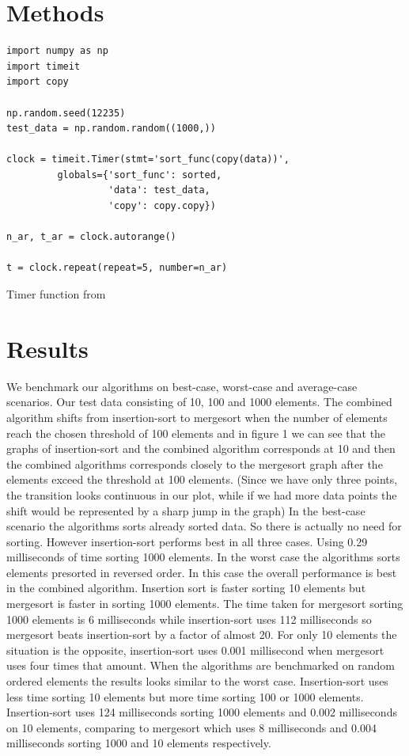 \documentclass[sigconf, nonacm, natbib, screen, balance=False]{acmart}
\begin{document}
\section{Methods}\label{sec:methods}


\begin{listing}
\begin{lstlisting}
import numpy as np
import timeit
import copy

np.random.seed(12235)
test_data = np.random.random((1000,))

clock = timeit.Timer(stmt='sort_func(copy(data))',
         globals={'sort_func': sorted,
                  'data': test_data,
                  'copy': copy.copy})

n_ar, t_ar = clock.autorange()

t = clock.repeat(repeat=5, number=n_ar)
\end{lstlisting}
  \caption{Timer function from \cite{Template}}
  \label{lst:timeit}
\end{listing}




\section{Results}\label{sec:results}

We benchmark our algorithms on best-case, worst-case and average-case scenarios. Our test data consisting of 10, 100 and 1000 elements. The combined algorithm shifts from insertion-sort to mergesort when the number of elements reach the chosen threshold of 100 elements and in figure 1 we can see that the graphs of insertion-sort and the combined algorithm corresponds at 10 and then the combined algorithms corresponds closely to the mergesort graph after the elements exceed the threshold at 100 elements. (Since we have only three points, the transition looks continuous in our plot, while if we had more data points the shift would be represented by a sharp jump in the graph) In the best-case scenario the algorithms sorts already sorted data. So there is actually no need for sorting. However insertion-sort performs best in all three cases. Using 0.29 milliseconds of time sorting 1000 elements. In the worst case the algorithms sorts elements presorted in reversed order. In this case the overall performance is best in the combined algorithm. Insertion sort is faster sorting 10 elements but mergesort is faster in sorting 1000 elements. The time taken for mergesort sorting 1000 elements is 6 milliseconds while insertion-sort uses 112 milliseconds so mergesort beats insertion-sort by a factor of almost 20. For only 10 elements the situation is the opposite, insertion-sort uses 0.001 millisecond when mergesort uses four times that amount. When the algorithms are benchmarked on random ordered elements the results looks similar to the worst case. Insertion-sort uses less time sorting 10 elements but more time sorting 100 or 1000 elements. Insertion-sort uses 124 milliseconds sorting 1000 elements and 0.002 milliseconds on 10 elements, comparing to mergesort which uses 8 milliseconds and 0.004 milliseconds sorting 1000 and 10 elements respectively. 
\end{document}
